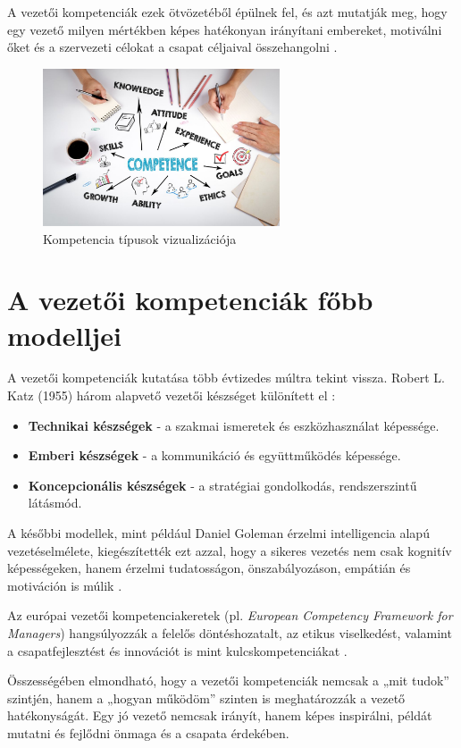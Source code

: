A vezetői kompetenciák ezek ötvözetéből épülnek fel, és azt mutatják meg, hogy egy vezető milyen mértékben képes hatékonyan irányítani embereket, motiválni őket és a szervezeti célokat a csapat céljaival összehangolni \cite{boyatzis1982}.
\begin{figure}[H]
	\centering
    \includegraphics[width=70mm, keepaspectratio]{figures/competence.jpg}
    \caption{Kompetencia típusok vizualizációja} 
    \label {fig:competence}
\end{figure}
\section{A vezetői kompetenciák főbb modelljei}

A vezetői kompetenciák kutatása több évtizedes múltra tekint vissza. 
Robert L. Katz (1955) három alapvető vezetői készséget különített el \cite{katz1955}:

\begin{itemize}
    \item \textbf{Technikai készségek} - a szakmai ismeretek és eszközhasználat képessége.
    \item \textbf{Emberi készségek} - a kommunikáció és együttműködés képessége.
    \item \textbf{Koncepcionális készségek} - a stratégiai gondolkodás, rendszerszintű látásmód.
\end{itemize}

A későbbi modellek, mint például Daniel Goleman érzelmi intelligencia alapú vezetéselmélete, 
kiegészítették ezt azzal, hogy a sikeres vezetés nem csak kognitív képességeken, 
hanem érzelmi tudatosságon, önszabályozáson, empátián és motiváción is múlik \cite{goleman1998}. 

Az európai vezetői kompetenciakeretek (pl. \textit{European Competency Framework for Managers}) 
hangsúlyozzák a felelős döntéshozatalt, az etikus viselkedést, valamint a csapatfejlesztést és innovációt is mint kulcskompetenciákat \cite{ecfm2010}.

Összességében elmondható, hogy a vezetői kompetenciák nemcsak a „mit tudok” szintjén, 
hanem a „hogyan működöm” szinten is meghatározzák a vezető hatékonyságát. 
Egy jó vezető nemcsak irányít, hanem képes inspirálni, példát mutatni és fejlődni önmaga és a csapata érdekében.